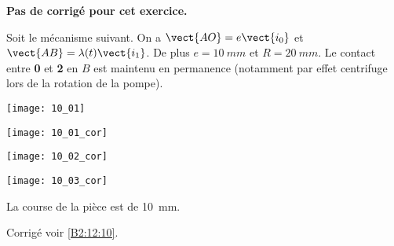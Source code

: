 \normalfalse \difficiletrue \tdifficilefalse
\correctionfalse


\setcounter{numques}{0}
\ifcorrection
\else
\textbf{Pas de corrigé pour cet exercice.}
\fi

\ifprof
\else
Soit le mécanisme suivant. On a $\vect{AO}=e\vect{i_0}$ et $\vect{AB}=\lambda(t)\vect{i_1}$. De plus $e=\SI{10}{mm}$ et $R=\SI{20}{mm}$. Le contact entre \textbf{0} et \textbf{2} en $B$ est maintenu en permanence (notamment par effet centrifuge lors de la rotation de la pompe).
\begin{center}
\texttt{[image: 10\_01]}
\end{center}
\fi


\ifprof
\begin{center}
\texttt{[image: 10\_01\_cor]}
\end{center}

\else
\fi


\ifprof
\begin{center}
\texttt{[image: 10\_02\_cor]}
\end{center}
\else
\fi

\ifprof
\begin{center}
\texttt{[image: 10\_03\_cor]}
\end{center}
\else
\fi


\ifprof
La course de la pièce est de \SI{10}{mm}.
\else
\fi



\ifprof
\else
\begin{flushright}
\footnotesize{Corrigé  voir \ref{B2:12:10}.}
\end{flushright}%
\fi